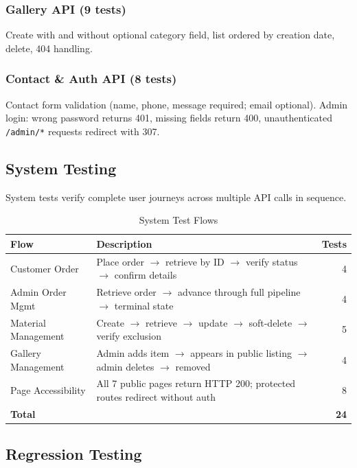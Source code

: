 \documentclass[12pt, a4paper]{article}
\begin{document}
\subsubsection{Gallery API (9 tests)}

Create with and without optional category field, list ordered by creation date, delete, 404 handling.

\subsubsection{Contact \& Auth API (8 tests)}

Contact form validation (name, phone, message required; email optional). Admin login: wrong password returns 401, missing fields return 400, unauthenticated \texttt{/admin/*} requests redirect with 307.

\subsection{System Testing}

System tests verify complete user journeys across multiple API calls in sequence.

\begin{table}[H]
\centering
\caption{System Test Flows}
\begin{tabularx}{\textwidth}{lXr}
\toprule
\textbf{Flow} & \textbf{Description} & \textbf{Tests} \\
\midrule
Customer Order       & Place order $\to$ retrieve by ID $\to$ verify status $\to$ confirm details & 4 \\
Admin Order Mgmt     & Retrieve order $\to$ advance through full pipeline $\to$ terminal state & 4 \\
Material Management  & Create $\to$ retrieve $\to$ update $\to$ soft-delete $\to$ verify exclusion & 5 \\
Gallery Management   & Admin adds item $\to$ appears in public listing $\to$ admin deletes $\to$ removed & 4 \\
Page Accessibility   & All 7 public pages return HTTP 200; protected routes redirect without auth & 8 \\
\midrule
\textbf{Total} & & \textbf{24} \\
\bottomrule
\end{tabularx}
\end{table}

\subsection{Regression Testing}
\end{document}

